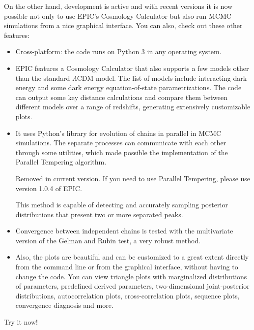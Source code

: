 \documentclass[letterpaper,12pt,english]{sphinxhowto}
\begin{document}
On the other hand, development is active and with recent versions it is now
possible not only to use EPIC’s Cosmology Calculator but also run MCMC
simulations from a nice graphical interface.
You can also, check out these other features:
\begin{itemize}
\item {} 
Cross-platform: the code runs on Python 3 in any operating system.

\item {} 
EPIC features a Cosmology Calculator that also supports a few models other
than the standard \(\Lambda\text{CDM}\) model.
The list of models include interacting dark energy and some dark energy
equation-of-state parametrizations.
The code can output some key distance calculations and compare them between
different models over a range of redshifts, generating extensively
customizable plots.

\item {} 
It uses Python’s  library for evolution of chains in
parallel in MCMC simulations.
The separate processes can communicate with each other through some
 utilities, which made possible the implementation of the
Parallel Tempering algorithm. %
\begin{footnote}[2]\sphinxAtStartFootnote
Removed in current version. If you need to use Parallel Tempering, please use version 1.0.4 of EPIC.
%
\end{footnote} This method is capable of detecting
and accurately sampling posterior distributions that present two or more
separated peaks.

\item {} 
Convergence between independent chains is tested with the multivariate
version of the Gelman and Rubin test, a very robust method.

\item {} 
Also, the plots are beautiful and can be customized to a great extent
directly from the command line or from the graphical interface, without
having to change the code.
You can view triangle plots with marginalized distributions of parameters,
predefined derived parameters, two-dimensional joint-posterior distributions,
autocorrelation plots, cross-correlation plots, sequence plots, convergence
diagnosis and more.

\end{itemize}

Try it now!
\end{document}
